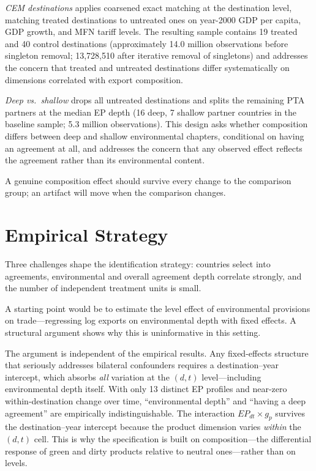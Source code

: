 \documentclass[12pt]{article}
\begin{document}
\emph{CEM destinations} applies coarsened exact matching \citep{iacus2012} at the
destination level, matching treated destinations to untreated ones on year-2000 GDP per
capita, GDP growth, and MFN tariff levels. The resulting sample contains 19 treated and
40 control destinations (approximately 14.0 million observations before singleton removal; 13,728,510 after iterative removal of singletons) and addresses the concern that
treated and untreated destinations differ systematically on dimensions correlated with
export composition.

\emph{Deep vs.\ shallow} drops all untreated destinations and splits the remaining PTA
partners at the median EP depth (16 deep, 7 shallow partner countries in the baseline sample; 5.3 million
observations). This design asks whether composition differs between deep and shallow
environmental chapters, conditional on having an agreement at all, and addresses the
concern that any observed effect reflects the agreement rather than its environmental
content.

A genuine composition effect should survive every change to the comparison group; an artifact will move when the comparison changes.

\section{Empirical Strategy}\label{sec:strategy}

Three challenges shape the identification strategy: countries select into agreements, environmental and overall agreement depth correlate strongly, and the number of independent treatment units is small.

A starting point would be to estimate the level effect of environmental provisions
on trade---regressing log exports on environmental depth with fixed effects. A
structural argument shows why this is uninformative in this setting.

The argument is independent of the empirical results. Any fixed-effects
structure that seriously addresses bilateral confounders requires a destination--year
intercept, which absorbs \emph{all} variation at the $(d,t)$ level---including
environmental depth itself. With only 13 distinct EP profiles and
near-zero within-destination change over time, ``environmental depth'' and ``having a
deep agreement'' are empirically indistinguishable. The interaction
$EP_{dt} \times g_p$ survives the destination--year intercept because the product
dimension varies \emph{within} the $(d,t)$ cell. This is why the specification is
built on composition---the differential response of green and dirty products relative
to neutral ones---rather than on levels.
\end{document}
